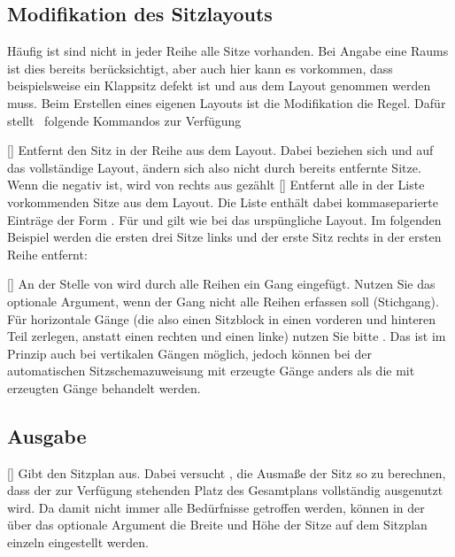 \documentclass[
babel-options={ngerman},
load-preamble-,
scrartcl={headings=small}
]{cnltx-doc}
\providecommand{\packagename}{seatingchart}
\def\thepkg{\pkg*{\packagename}}
\begin{document}
\subsection{Modifikation des Sitzlayouts}
\label{sec:modify-layout}
Häufig ist sind nicht in jeder Reihe alle Sitze vorhanden.
Bei Angabe eine Raums ist dies bereits berücksichtigt, aber auch hier kann es
vorkommen, dass beispielsweise ein Klappsitz defekt ist und aus dem Layout
genommen werden muss.
Beim Erstellen eines eigenen Layouts ist die Modifikation die Regel.
Dafür stellt \pkg\ folgende Kommandos zur Verfügung
\begin{commands}
  []
  Entfernt den Sitz  in der Reihe  aus dem
  Layout. Dabei beziehen sich  und  auf das
  vollständige Layout, ändern sich also nicht durch bereits entfernte Sitze.
  Wenn die  negativ ist, wird von rechts aus gezählt
  []
  Entfernt alle in der Liste vorkommenden Sitze aus dem Layout. Die Liste enthält
  dabei kommaseparierte Einträge der Form
  . Für  und
   gilt wie bei  das urspüngliche Layout.
  Im folgenden Beispiel werden die ersten drei Sitze links und der erste Sitz
  rechts in der ersten Reihe entfernt:
  \begin{example}
  \end{example}\vspace{-1.3\baselineskip}
  []
  An der Stelle von  wird durch alle Reihen ein Gang eingefügt. Nutzen Sie das
  optionale Argument, wenn der Gang nicht alle Reihen erfassen soll (Stichgang).
  Für horizontale Gänge (die also einen Sitzblock in einen vorderen und hinteren
  Teil zerlegen, anstatt einen rechten und einen linke) nutzen Sie bitte
  .
  Das ist im Prinzip auch bei vertikalen Gängen möglich, jedoch können bei der automatischen
  Sitzschemazuweisung mit  erzeugte Gänge anders als die mit
   erzeugten Gänge behandelt werden.
\end{commands}

\subsection{Ausgabe}
\label{sec:drawing}
\begin{commands}
  
  []
  Gibt den Sitzplan aus. Dabei versucht \thepkg, die Ausmaße der Sitz so zu
  berechnen, dass der zur Verfügung stehenden Platz des Gesamtplans vollständig
  ausgenutzt wird.
  Da damit nicht immer alle Bedürfnisse getroffen werden, können in der
  über das optionale Argument die Breite und Höhe der Sitze auf
  dem Sitzplan einzeln eingestellt werden.
\end{commands}
\end{document}

